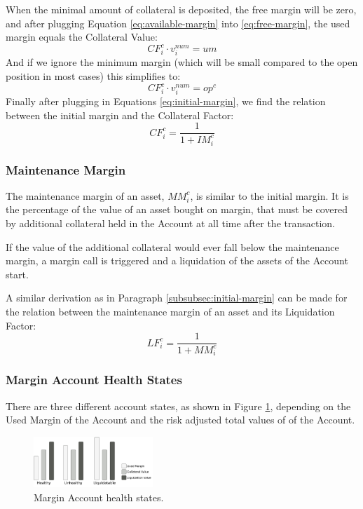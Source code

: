 \documentclass[sigconf,nonacm]{acmart}
\begin{document}
When the minimal amount of collateral is deposited, the free margin will be zero, and after plugging Equation \ref{eq:available-margin} into \ref{eq:free-margin}, the used margin equals the Collateral Value:
\begin{equation}
    CF_{i}^{c} \cdot v^{num}_i = um
\end{equation}
And if we ignore the minimum margin (which will be small compared to the open position in most cases) this simplifies to:
\begin{equation}
    CF_{i}^{c} \cdot v^{num}_i = op^c
\end{equation}
Finally after plugging in Equations \ref{eq:initial-margin}, we find the relation between the initial margin and the Collateral Factor:
\begin{equation}
    CF_{i}^{c} = \frac{1}{1 + IM_{i}^{c}}
\end{equation}

\subsubsection{Maintenance Margin}
The maintenance margin of an asset, $MM_{i}^{c}$, is similar to the initial margin.
It is the percentage of the value of an asset bought on margin, that must be covered by additional collateral held in the Account at all time after the transaction.

If the value of the additional collateral would ever fall below the maintenance margin, a margin call is triggered and a liquidation of the assets of the Account start.

A similar derivation as in Paragraph \ref{subsubsec:initial-margin} can be made for the relation between the maintenance margin of an asset and its Liquidation Factor:
\begin{equation}
    LF_{i}^{c} = \frac{1}{1 + MM_{i}^{c}}
\end{equation}

\subsubsection{Margin Account Health States}
\label{subsubsec:margin-account-health-states}
There are three different account states, as shown in Figure \ref{fig:health-states},
depending on the Used Margin of the Account and the risk adjusted total values of of the Account.

\begin{figure}
    \centering
    \includegraphics[width=0.4\textwidth]{images/Health-States.png}
    \caption{Margin Account health states. \label{fig:health-states}}
\end{figure}
\end{document}
